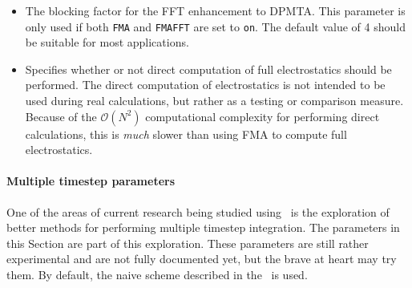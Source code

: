 \begin{itemize}
\item
{}
{The blocking factor for the FFT enhancement to DPMTA.
This parameter is only used if both \verb!FMA! and \verb!FMAFFT! 
are set to \verb!on!.  The default value of 4 should be suitable
for most applications.}

\item
{}
{Specifies whether or not direct computation of 
full electrostatics should be performed.  
The direct computation of electrostatics 
is not intended to be used during 
real calculations, but rather as a testing or 
comparison measure.  Because of the ${\mathcal O}(N^2)$ 
computational complexity for performing 
direct calculations, this is {\it much} 
slower than using FMA to compute full 
electrostatics.}

\end{itemize}

\paragraph{Multiple timestep parameters}

One of the areas of current research being studied using \NAMD\ is the
exploration of better methods for performing multiple timestep integration.
The parameters in this Section are part of this exploration.  These parameters
are still rather experimental and are not fully documented yet, but the
brave at heart may try them.  By default, the naive scheme described
in the \PG\ is used.

